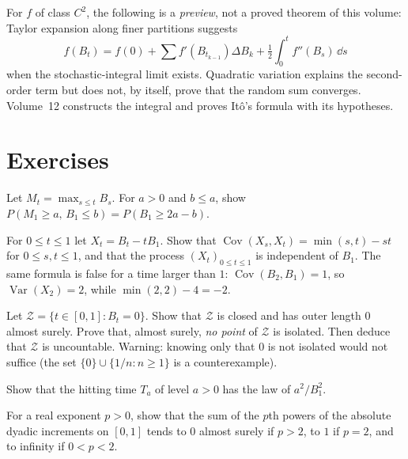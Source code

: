 For $f$ of class $C^2$, the following is a \emph{preview}, not a proved theorem of this volume: Taylor expansion along finer partitions suggests
\[
 f(B_t)=f(0)+\sum f'(B_{t_{k-1}})\Delta B_k+\tfrac12\int_0^t f''(B_s)\,\dd s
\]
when the stochastic-integral limit exists. Quadratic variation explains the second-order term but does not, by itself, prove that the random sum converges. Volume~12 constructs the integral and proves It\^o's formula with its hypotheses.

\section{Exercises}

\begin{exercise}[$\star\star$]\label{ex:maxjoint}
Let $M_t=\max_{s\le t}B_s$. For $a>0$ and $b\le a$, show $P(M_1\ge a,\,B_1\le b)=P(B_1\ge 2a-b)$.
\end{exercise}

\begin{exercise}[$\star$]\label{ex:bridge}
For $0\le t\le 1$ let $X_t=B_t-tB_1$. Show that $\operatorname{Cov}(X_s,X_t)=\min(s,t)-st$ for $0\le s,t\le 1$, and that the process $(X_t)_{0\le t\le 1}$ is independent of $B_1$. The same formula is false for a time larger than $1$: $\operatorname{Cov}(B_2,B_1)=1$, so $\operatorname{Var}(X_2)=2$, while $\min(2,2)-4=-2$.
\end{exercise}

\begin{exercise}[$\star\star$]\label{ex:zeros}
Let $\mathcal Z=\{t\in[0,1]:B_t=0\}$. Show that $\mathcal Z$ is closed and has outer length $0$ almost surely. Prove that, almost surely, \emph{no point} of $\mathcal Z$ is isolated. Then deduce that $\mathcal Z$ is uncountable. Warning: knowing only that $0$ is not isolated would not suffice (the set $\{0\}\cup\{1/n:n\ge1\}$ is a counterexample).
\end{exercise}

\begin{exercise}[$\star$]\label{ex:hittingdensity}
Show that the hitting time $T_a$ of level $a>0$ has the law of $a^2/B_1^2$.
\end{exercise}

\begin{exercise}[$\star$]\label{ex:pvariation}
For a real exponent $p>0$, show that the sum of the $p$th powers of the absolute dyadic increments on $[0,1]$ tends to $0$ almost surely if $p>2$, to $1$ if $p=2$, and to infinity if $0<p<2$.
\end{exercise}

